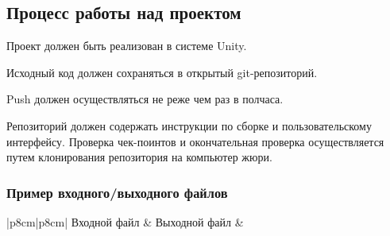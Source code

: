 



\subsection*{Процесс работы над проектом}

Проект должен быть реализован в системе Unity.

Исходный код должен сохраняться в открытый git-репозиторий.

Push должен осуществляться не реже чем раз в полчаса.

Репозиторий должен содержать инструкции по сборке и пользовательскому интерфейсу. Проверка чек-поинтов и окончательная проверка осуществляется путем клонирования репозитория на компьютер жюри.


\subsubsection*{Пример входного/выходного файлов}

\begin{tabular}{|p{8cm}|p{8cm}|}
    Входной файл & Выходной файл
     &
     \\
\end{tabular}




